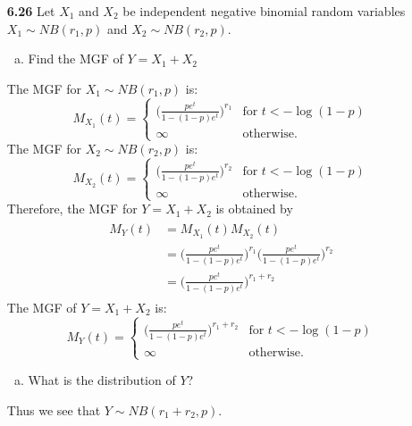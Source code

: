 \documentclass[11pt]{article}
\theoremstyle{definition}
\newcommand{\1}[1]{\mathbf{1} \left \{ #1 \right \}}
\begin{document}
\begin{itemize}
\item [{\color{red} \textbf{6.26}}] Let $X_1$ and $X_2$ be independent negative binomial random variables $X_1 \sim NB(r_1, p)$ and $X_2 \sim NB(r_2, p)$.
\begin{enumerate}[(a)]
\item Find the MGF of $Y = X_1 + X_2$
\end{enumerate}
The MGF for $X_1 \sim NB(r_1, p)$ is:
\[M_{X_1}(t) =
\begin{cases}
\Big(\frac{pe^t}{1 - (1 - p)e^t}\Big)^{r_1} &\text{for $t < -\log(1-p)$} \\ \infty& \text{otherwise.}
\end{cases}
\]
The MGF for $X_2 \sim NB(r_2, p)$ is:
\[M_{X_2}(t) =
\begin{cases}
\Big(\frac{pe^t}{1 - (1 - p)e^t}\Big)^{r_2} &\text{for $t < -\log(1-p)$} \\ \infty& \text{otherwise.}
\end{cases}
\]
Therefore, the MGF for $Y = X_1 + X_2$ is obtained by
\begin{align*}
    \begin{split}
        M_Y(t) &= M_{X_1}(t)M_{X_2}(t) \\
        &= \Bigg(\frac{pe^t}{1 - (1 - p)e^t}\Bigg)^{r_1} \Bigg(\frac{pe^t}{1 - (1 - p)e^t}\Bigg)^{r_2} \\
        &= \Bigg(\frac{pe^t}{1 - (1 - p)e^t}\Bigg)^{r_1 + r_2}
    \end{split}
\end{align*}
The MGF of $Y = X_1 + X_2$ is:
\[M_Y(t) =
\begin{cases}
\Big(\frac{pe^t}{1 - (1 - p)e^t}\Big)^{r_1 + r_2} &\text{for $t < -\log(1-p)$} \\ \infty& \text{otherwise.}
\end{cases}
\]
\begin{enumerate}[(b)]
\item What is the distribution of $Y$?
\end{enumerate}
Thus we see that $Y \sim NB(r_1 +r_2, p)$.

\end{itemize}
\end{document}
